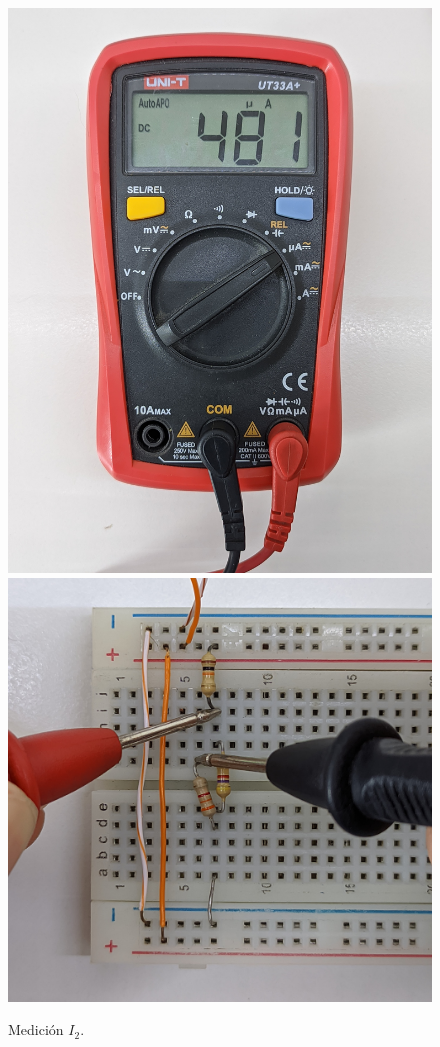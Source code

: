 \documentclass[a4paper,12pt, spanish]{report}
\begin{document}
\begin{figure}[H]
\begin{minipage}{0.3\textwidth}
            \caption{Medición $I_2$.}
          \end{minipage}
          \begin{minipage}{0.3\textwidth}
            \centering
            \includegraphics[width=1\linewidth]{pictures/mult-i3.jpg}
            \includegraphics[width=1\linewidth]{pictures/prot-i3.jpg}

\end{minipage}
\end{figure}
\end{document}
